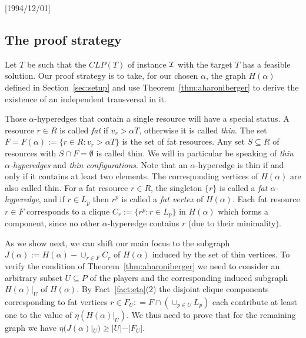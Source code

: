 \NeedsTeXFormat{LaTeX2e}[1994/12/01]\documentclass[letterpaper, 11pt]{article}
\theoremstyle{definition}
\theoremstyle{remark}
\numberwithin{equation}{section}
\begin{document}
\subsection{The proof strategy}\label{sec:strategy}
Let $T$ be such that the $CLP(T)$ of instance ${\cal I}$  with the target $T$
has a feasible solution.
Our proof strategy is to take, for our chosen $\alpha$,
the graph $H(\alpha)$ defined in Section~\ref{sec:setup}
and use Theorem~\ref{thm:aharoniberger} to derive
the existence of an independent transversal in it.


Those $\alpha$-hyperedges that contain a single resource will have a special status. 
A resource $r\in R$ is called {\em fat} if $v_r >
\alpha T$, otherwise it is called {\em thin}.
The set $F = F(\alpha) := \{ r\in R: v_r > \alpha T \}$ is the set of
fat resources. Any set $S\subseteq R$ of resources with $S\cap F =
\emptyset$ is called thin. We will in particular be speaking of {\em thin
  $\alpha$-hyperedges} and {\em thin configurations}.
Note that an $\alpha$-hyperedge is thin if and only if it contains at
least two elements. The corresponding vertices
of $H(\alpha)$ are also called thin. 
For a fat resource $r\in R$, the singleton $\{ r \}$ is called a {\em fat
$\alpha$-hyperedge}, and if $r\in L_p$ then 
$r^p$ is called a {\em fat vertex} of $H(\alpha)$. 
Each fat resource $r\in F$ corresponds to a clique $C_r :=
\{ r^p : r\in L_p \}$ in  $H(\alpha)$ which forms a component, since no other
$\alpha$-hyperedge contains $r$ (due to their minimality).

As we show next, we can shift our main focus to the subgraph
$J(\alpha) := H(\alpha)- \cup_{r\in F} C_r$ of $H(\alpha)$
induced by the set of thin vertices.  
To verify the condition  of Theorem~\ref{thm:aharoniberger} we need to
consider an arbitrary subset $U\subseteq P$ of the players and 
the corresponding induced subgraph $H(\alpha)|_U$ of $H(\alpha)$.
By Fact~\ref{fact:eta}(2) the disjoint clique components corresponding to fat
vertices $r\in F_U : = F\cap (\cup_{p\in U} L_p)$ each contribute at least one to the
value of $\eta(H(\alpha)|_U)$. 
We thus need to prove that for the remaining
graph we have $\eta (J(\alpha)|_U) \geq |U|-|F_U|$.
\end{document}
